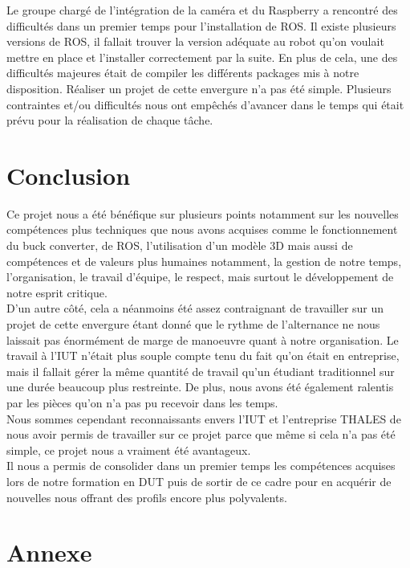 \documentclass{PackagerQualityN}
\begin{document}
Le groupe chargé de l'intégration de la caméra et du Raspberry a rencontré des difficultés dans un premier temps pour l'installation de ROS. Il existe plusieurs versions de ROS, il fallait trouver la version adéquate au robot qu'on voulait mettre en place et l'installer correctement par la suite.
En plus de cela, une des difficultés majeures était de compiler les différents packages mis à notre disposition. Réaliser un projet de cette envergure n’a pas été simple. Plusieurs contraintes et/ou difficultés nous ont empêchés d’avancer dans le temps qui était prévu pour la réalisation de chaque tâche.\\


\newp
\section*{Conclusion}
Ce projet nous a été bénéfique sur plusieurs points notamment sur les nouvelles compétences plus techniques que nous avons acquises comme le fonctionnement du buck converter, de ROS, l'utilisation d'un modèle 3D mais aussi de compétences et de valeurs plus humaines notamment, la gestion de notre temps, l'organisation, le travail d'équipe, le respect, mais surtout le développement de notre esprit critique.\\

D'un autre côté, cela a néanmoins été assez contraignant de travailler sur un projet de cette envergure étant donné que le rythme de l'alternance ne nous laissait pas énormément de marge de manoeuvre quant à notre organisation. Le travail à l'IUT n'était plus souple compte tenu du fait qu'on était en entreprise, mais il fallait gérer la même quantité de travail qu'un étudiant traditionnel sur une durée beaucoup plus restreinte.
De plus, nous avons été également ralentis par les pièces qu'on n’a pas pu recevoir dans les temps.\\

Nous sommes cependant reconnaissants envers l'IUT et l'entreprise THALES de nous avoir permis de travailler sur ce projet parce que même si cela n'a pas été simple, ce projet nous a vraiment été avantageux.\\

Il nous a permis de consolider dans un premier temps les compétences acquises lors de notre formation en DUT puis de sortir de ce cadre pour en acquérir de nouvelles nous offrant des profils encore plus polyvalents.


\newp
\section*{Annexe}
\end{document}
